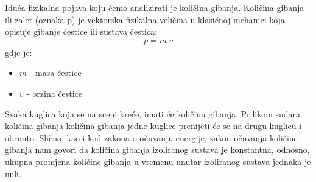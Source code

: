 Iduća fizikalna pojava koju ćemo analizirati je količina gibanja. Količina gibanja ili zalet (oznaka p) je vektorska fizikalna veličina u klasičnoj mehanici koja opisuje gibanje čestice ili sustava čestica\cite{12}:
\begin{equation}\label{equ:impuls}
\begin{aligned}
	p = m \ v
\end{aligned}
\end{equation}
gdje je:
\begin{itemize}
	\item $m$ - masa čestice
	\item $v$ - brzina čestice
\end{itemize}
Svaka kuglica koja se na sceni kreće, imati će količinu gibanja. Prilikom sudara količina gibanja količina gibanja jedne kuglice prenijeti će se na drugu kuglicu i obrnuto. Slično, kao i kod zakona o očuvanju energije, zakon očuvanja količine gibanja nam govori da količina gibanja izoliranog sustava je konstantna, odnosno, ukupna promjena količine gibanja u vremenu unutar izoliranog sustava jednaka je nuli\cite{12}.

